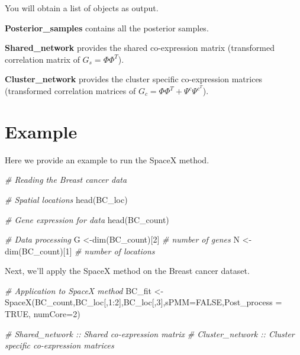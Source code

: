 \documentclass[
]{book}
\newenvironment{Shaded}{\begin{snugshade}}{\end{snugshade}}
\newcommand{\AttributeTok}[1]{\textcolor[rgb]{0.77,0.63,0.00}{#1}}
\newcommand{\CommentTok}[1]{\textcolor[rgb]{0.56,0.35,0.01}{\textit{#1}}}
\newcommand{\ConstantTok}[1]{\textcolor[rgb]{0.00,0.00,0.00}{#1}}
\newcommand{\DecValTok}[1]{\textcolor[rgb]{0.00,0.00,0.81}{#1}}
\newcommand{\FunctionTok}[1]{\textcolor[rgb]{0.00,0.00,0.00}{#1}}
\newcommand{\NormalTok}[1]{#1}
\newcommand{\OtherTok}[1]{\textcolor[rgb]{0.56,0.35,0.01}{#1}}
\newcommand{\SpecialCharTok}[1]{\textcolor[rgb]{0.00,0.00,0.00}{#1}}
\begin{document}
You will obtain a list of objects as output.

\textbf{Posterior\_samples} contains all the posterior samples.

\textbf{Shared\_network} provides the shared co-expression matrix (transformed correlation matrix of \(G_{s} = \Phi \Phi^{T}\)).

\textbf{Cluster\_network} provides the cluster specific co-expression matrices (transformed correlation matrices of \(G_{c} = \Phi \Phi^{T} + \Psi^{c} {\Psi^{c^{T}}}\)).

\hypertarget{example}{%
\section{Example}\label{example}}

Here we provide an example to run the SpaceX method.

\begin{Shaded}
\begin{Highlighting}[]
\CommentTok{\# Reading the Breast cancer data}

\CommentTok{\# Spatial locations}
\FunctionTok{head}\NormalTok{(BC\_loc)}

\CommentTok{\# Gene expression for data}
\FunctionTok{head}\NormalTok{(BC\_count) }

\CommentTok{\# Data processing}
\NormalTok{G }\OtherTok{\textless{}{-}}\FunctionTok{dim}\NormalTok{(BC\_count)[}\DecValTok{2}\NormalTok{] }\CommentTok{\# number of genes}
\NormalTok{N }\OtherTok{\textless{}{-}}\FunctionTok{dim}\NormalTok{(BC\_count)[}\DecValTok{1}\NormalTok{] }\CommentTok{\# number of locations}
\end{Highlighting}
\end{Shaded}

Next, we'll apply the SpaceX method on the Breast cancer dataset.

\begin{Shaded}
\begin{Highlighting}[]
\CommentTok{\# Application to SpaceX method}
\NormalTok{BC\_fit }\OtherTok{\textless{}{-}} \FunctionTok{SpaceX}\NormalTok{(BC\_count,BC\_loc[,}\DecValTok{1}\SpecialCharTok{:}\DecValTok{2}\NormalTok{],BC\_loc[,}\DecValTok{3}\NormalTok{],}\AttributeTok{sPMM=}\ConstantTok{FALSE}\NormalTok{,}\AttributeTok{Post\_process =} \ConstantTok{TRUE}\NormalTok{, }\AttributeTok{numCore=}\DecValTok{2}\NormalTok{)}

\CommentTok{\# Shared\_network :: Shared co{-}expression matrix}
\CommentTok{\# Cluster\_network :: Cluster specific co{-}expression matrices}
\end{Highlighting}
\end{Shaded}


  
\end{document}
